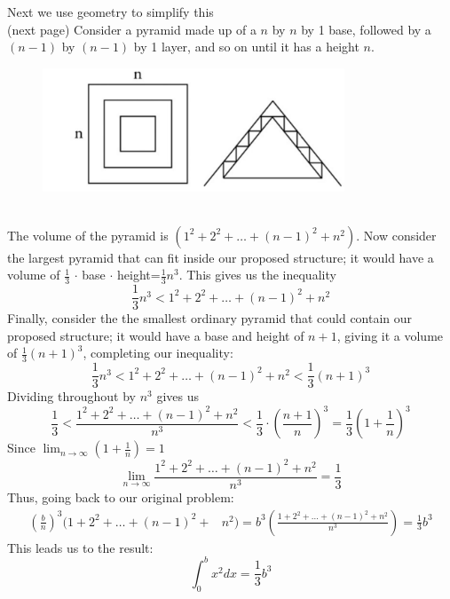 \documentclass{report}
\begin{document}
Next we use geometry to simplify this\\
(next page)
\newpage
\noindent Consider a pyramid made up of a $n$ by $n$ by 1 base, 
followed by a $(n-1)$ by $(n-1)$ by 1 layer, and so on until it has a height $n$.
\begin{figure}[h]
\includegraphics[width=9cm]{Capture28}\\
\centering
{}
\end{figure}\\
The volume of the pyramid is $(1^2+2^2+\ldots+(n-1)^2+n^2)$. 
Now consider the largest pyramid that can fit inside our proposed structure; it would
have a volume of $\frac{1}{3}$ $\cdot$ base $\cdot$ height=$\frac{1}{3}n^3$. This gives us the inequality
\begin{equation*}
\frac{1}{3}n^3<1^2+2^2+\ldots+(n-1)^2+n^2
\end{equation*}
Finally, consider the the smallest ordinary pyramid that could contain our proposed structure;
it would have a base and height of $n+1$, giving it a volume of $\frac{1}{3}(n+1)^3$,
completing our inequality:
\begin{equation*}
\frac{1}{3}n^3<1^2+2^2+\ldots+(n-1)^2+n^2
<\frac{1}{3}(n+1)^3
\end{equation*}
Dividing throughout by $n^3$ gives us
\begin{equation*}
\frac{1}{3}<\frac{1^2+2^2+\ldots+(n-1)^2+n^2}{n^3}
<\frac{1}{3}\cdot\left(\frac{n+1}{n}\right)^3
=\frac{1}{3}\left(1+\frac{1}{n}\right)^3
\end{equation*}
Since $\lim_{n\to\infty}\left(1+\frac{1}{n}\right)=1$
\begin{equation*}
\lim_{n\to\infty}\frac{1^2+2^2+\ldots+(n-1)^2+n^2}{n^3}=\frac{1}{3}
\end{equation*}
Thus, going back to our original problem:
\begin{align*}
\left(\frac{b}{n}\right)^3(1+2^2+\ldots+(n-1)^2+&n^2)
=b^3\left(\frac{1+2^2+\ldots+(n-1)^2+n^2}{n^3}\right)
=\frac{1}{3}b^3
\end{align*}
This leads us to the result:
\begin{equation*}
\int_0^bx^2dx=\frac{1}{3}b^3
\end{equation*}
\newpage
\end{document}
